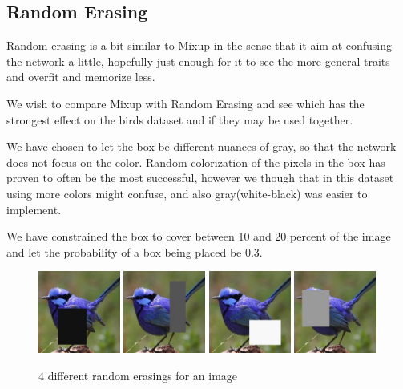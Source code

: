\documentclass{article}
\begin{document}
\subsection{Random Erasing}

Random erasing is a bit similar to Mixup in the sense that it aim at confusing the network a little, hopefully just enough for it to see the more general traits and overfit and memorize less.

We wish to compare Mixup with Random Erasing and see which has the strongest effect on the birds dataset and if they may be used together.

We have chosen to let the box be different nuances of gray, so that the network does not focus on the color. Random colorization of the pixels in the box has proven to often be the most successful, however we though that in this dataset using more colors might confuse, and also gray(white-black) was easier to implement.

We have constrained the box to cover between 10 and 20 percent of the image and let the probability of a box being placed be 0.3. 

\begin{figure}[h]
	\includegraphics[width=0.24\textwidth]{re1.jpeg}
	\includegraphics[width=0.24\textwidth]{re2.jpeg}
	\includegraphics[width=0.24\textwidth]{re3.jpeg}
	\includegraphics[width=0.24\textwidth]{re4.jpeg}
	\caption{4 different random erasings for an image}
\end{figure}
\end{document}
